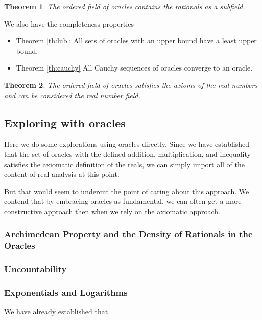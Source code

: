\documentclass[12pt]{article}
\newtheorem{theorem}{Theorem}
\theoremstyle{remark}
\begin{document}
\begin{theorem}
The ordered field of oracles contains the rationals as a subfield. 
\end{theorem}

We also have the completeness properties

\begin{itemize}
    \item  Theorem \ref{th:lub}: All sets of oracles with an upper bound have a least upper bound. 
    \item Theorem \ref{th:cauchy} All Cauchy sequences of oracles converge to an oracle. 
\end{itemize}

\begin{theorem}
The ordered field of oracles satisfies the axioms of the real numbers and can be considered the real number field. 
\end{theorem}

\subsection{Exploring with oracles}

Here we do some explorations using oracles directly. Since we have established that the set of oracles with the defined addition, multiplication, and inequality satisfies the axiomatic definition of the reals, we can simply import all of the content of real analysis at this point. 

But that would seem to undercut the point of caring about this approach. We contend that by embracing oracles as fundamental, we can often get a more constructive approach then when we rely on the axiomatic approach. 

\subsubsection{Archimedean Property and the Density of Rationals in the Oracles}

\subsubsection{Uncountability}

\subsubsection{Exponentials and Logarithms}

We have already established that 
\end{document}
